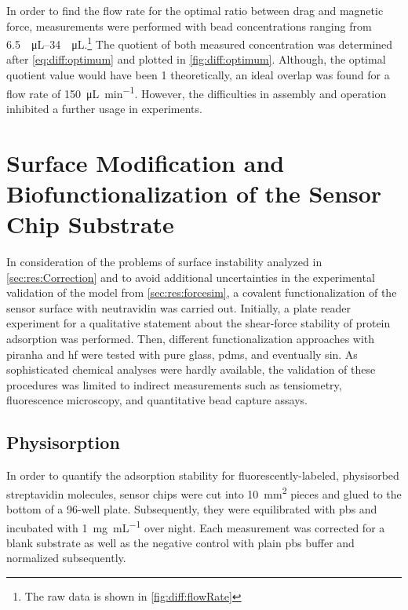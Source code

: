 In order to find the flow rate for the optimal ratio between drag and magnetic force, measurements were performed with bead concentrations ranging from \SIrange{6.5}{34}{\per\micro\liter}.\footnote{The raw data is shown in \cref{fig:diff:flowRate}} The quotient of both measured concentration was determined after \cref{eq:diff:optimum} and plotted in \cref{fig:diff:optimum}. Although, the optimal quotient value would have been \num{1} theoretically, an ideal overlap was found for a flow rate of \SI{150}{\micro\liter\per\minute}. However, the difficulties in assembly and operation inhibited a further usage in experiments.


\clearpage
\section{Surface Modification and Biofunctionalization of the Sensor Chip Substrate}
In consideration of the problems of surface instability analyzed in \cref{sec:res:Correction} and to avoid additional uncertainties in the experimental validation of the model from \cref{sec:res:forcesim}, a covalent functionalization of the sensor surface with neutravidin was carried out. Initially, a plate reader experiment for a qualitative statement about the shear-force stability of protein adsorption was performed. Then, different functionalization approaches with \gls{piranha} and \gls{hf} were tested with pure glass, \gls{pdms}, and eventually \gls{sin}. As sophisticated chemical analyses were hardly available, the validation of these procedures was limited to indirect measurements such as tensiometry, fluorescence microscopy, and quantitative bead capture assays.

\subsection{Physisorption}
In order to quantify the adsorption stability for fluorescently-labeled, physisorbed streptavidin molecules, sensor chips were cut into \SI{10}{\milli\meter\squared} pieces and glued to the bottom of a 96-well plate. Subsequently, they were equilibrated with \gls{pbs} and incubated with \SI{1}{\milli\gram\per\milli\liter} over night. Each measurement was corrected for a blank substrate as well as the negative control with plain \gls{pbs} buffer and normalized subsequently.


